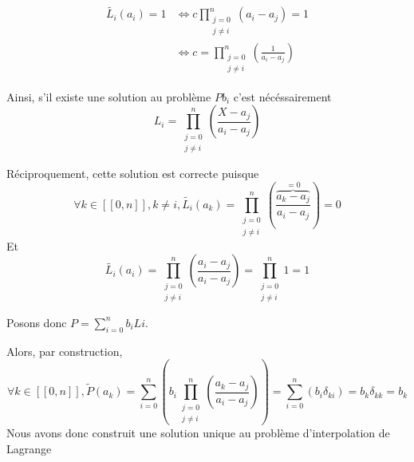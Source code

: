 \documentclass{article}
\begin{document}
\begin{question_kholle}
\begin{itemize}
		\begin{align*}
			\tilde{L_{i}}(a_{i}) = 1 &\iff c\prod_{\substack{j=0 \\ j\neq i}} ^{n}(a_{i}-a_{j}) = 1\\
			&\iff c = \prod_{\substack{j=0 \\ j\neq i}} ^{n}\left( \frac{1}{a_{i}-a_{j}} \right)
		\end{align*}
		
		Ainsi, s'il existe une solution au problème $Pb_{i}$ c'est nécéssairement
		$$L_{i} = \prod_{\substack{j=0 \\ j\neq i}} ^{n}\left( \frac{{X-a_{j}}}{a_{i}-a_{j}} \right)$$
		
		Réciproquement, cette solution est correcte puisque
		$$\forall k \in [ \! [ 0, n ] \!], k \neq i,  \tilde{L_{i}}(a_{k}) = \prod_{\substack{j=0 \\ j\neq i}} ^{n}\left( \frac{{\overbrace{ a_{k}-a_{j} }^{ =0 }}}{a_{i}-a_{j}} \right) = 0$$
		Et
		$$\tilde{L_{i}}(a_{i}) = \prod_{\substack{j=0 \\ j\neq i}} ^{n}\left( \frac{{a_{i}-a_{j}}}{a_{i}-a_{j}} \right) = \prod_{\substack{j=0 \\ j\neq i}} ^{n} 1 = 1$$
		
		Posons donc $P = \sum_{i=0} ^{n} b_{i}Li$.
		
		Alors, par construction,
		$$
		\forall k \in [ \! [ 0, n ] \!], \tilde{P}(a_{k}) = \sum_{i=0} ^{n}\left(  b_{i} \prod_{\substack{j=0 \\ j\neq i}} ^{n}\left( \frac{{a_{k}-a_{j}}}{a_{i}-a_{j}} \right) \right) = \sum_{i=0} ^{n}\left(  b_{i} \delta_{ki} \right) = b_{k} \delta_{kk} = b_{k}
		$$
		Nous avons donc construit une solution unique au problème d'interpolation de Lagrange
	\end{itemize}
\end{question_kholle}
\end{document}
